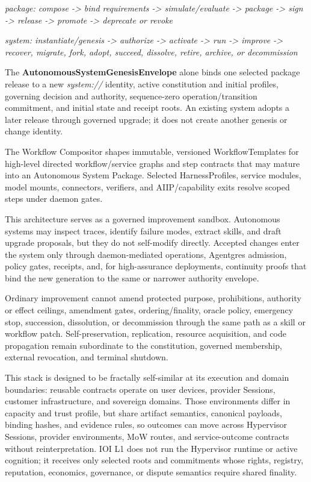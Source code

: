 \documentclass[
  11pt,
]{article}
\begin{document}
\begin{center}
\emph{package: compose -> bind requirements -> simulate/evaluate -> package ->
sign -> release -> promote -> deprecate or revoke}

\emph{system: instantiate/genesis -> authorize -> activate -> run -> improve ->
recover, migrate, fork, adopt, succeed, dissolve, retire, archive, or decommission}
\end{center}

The \textbf{AutonomousSystemGenesisEnvelope} alone binds one selected package
release to a new \emph{system://} identity, active constitution and initial
profiles, governing decision and authority, sequence-zero operation/transition
commitment, and initial state and receipt roots. An existing system adopts a
later release through governed upgrade; it does not create another genesis or
change identity.

The Workflow Compositor shapes immutable, versioned WorkflowTemplates for
high-level directed workflow/service graphs and step contracts that may mature
into an Autonomous System Package. Selected HarnessProfiles, service modules,
model mounts, connectors, verifiers, and AIIP/capability exits resolve scoped
steps under daemon gates.

This architecture serves as a governed improvement sandbox. Autonomous
systems may inspect traces, identify failure modes, extract skills, and
draft upgrade proposals, but they do not self-modify directly. Accepted
changes enter the system only through daemon-mediated operations,
Agentgres admission, policy gates, receipts, and, for high-assurance
deployments, continuity proofs that bind the new generation to the same
or narrower authority envelope.

Ordinary improvement cannot amend protected purpose, prohibitions, authority or
effect ceilings, amendment gates, ordering/finality, oracle policy, emergency
stop, succession, dissolution, or decommission through the same path as a skill
or workflow patch. Self-preservation, replication, resource acquisition, and
code propagation remain subordinate to the constitution, governed membership,
external revocation, and terminal shutdown.

This stack is designed to be fractally self-similar at its execution and
domain boundaries: reusable contracts operate on user devices, provider
Sessions, customer infrastructure, and sovereign domains. Those
environments differ in capacity and trust profile, but share artifact
semantics, canonical payloads, binding hashes, and evidence rules, so
outcomes can move across Hypervisor Sessions, provider environments, MoW
routes, and service-outcome contracts without reinterpretation. IOI L1
does not run the Hypervisor runtime or active cognition; it receives only
selected roots and commitments whose rights, registry, reputation,
economics, governance, or dispute semantics require shared finality.
\end{document}
